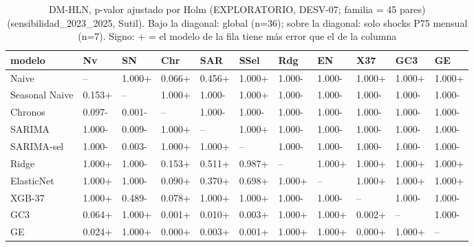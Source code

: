 \begin{table}[H]
\centering
\small
\caption{DM-HLN, p-valor ajustado por Holm (EXPLORATORIO, DESV-07; familia = 45 pares) (sensibilidad\_2023\_2025, Sutil). Bajo la diagonal: global (n=36); sobre la diagonal: solo shocks P75 mensual (n=7). Signo: + = el modelo de la fila tiene más error que el de la columna}
\label{tab:T09_DM_holm_matriz_sensibilidad_2023_2025_sutil}
\begin{tabular}{lllllllllll}
\toprule
modelo & Nv & SN & Chr & SAR & SSel & Rdg & EN & X37 & GC3 & GE \\
\midrule
Naive & -- & 1.000+ & 0.066+ & 0.456+ & 1.000+ & 1.000- & 1.000- & 1.000+ & 1.000+ & 1.000+ \\
Seasonal Naive & 0.153+ & -- & 1.000+ & 1.000- & 1.000+ & 1.000- & 1.000- & 1.000- & 1.000- & 1.000- \\
Chronos & 0.097- & 0.001- & -- & 1.000- & 1.000- & 1.000- & 1.000- & 1.000- & 1.000- & 1.000- \\
SARIMA & 1.000- & 0.009- & 1.000+ & -- & 1.000+ & 1.000- & 1.000- & 1.000- & 1.000- & 1.000- \\
SARIMA-sel & 1.000- & 0.003- & 1.000+ & 1.000+ & -- & 1.000- & 1.000- & 1.000- & 1.000- & 1.000- \\
Ridge & 1.000+ & 1.000- & 0.153+ & 0.511+ & 0.987+ & -- & 1.000+ & 1.000+ & 1.000+ & 1.000+ \\
ElasticNet & 1.000+ & 1.000- & 0.090+ & 0.370+ & 0.698+ & 1.000+ & -- & 1.000+ & 1.000+ & 1.000+ \\
XGB-37 & 1.000+ & 0.489- & 0.078+ & 1.000+ & 1.000+ & 1.000- & 1.000- & -- & 1.000- & 1.000- \\
GC3 & 0.064+ & 1.000+ & 0.001+ & 0.010+ & 0.003+ & 1.000+ & 1.000+ & 0.002+ & -- & 1.000- \\
GE & 0.024+ & 1.000+ & 0.000+ & 0.003+ & 0.001+ & 1.000+ & 1.000+ & 0.000+ & 1.000+ & -- \\
\bottomrule
\end{tabular}
\end{table}